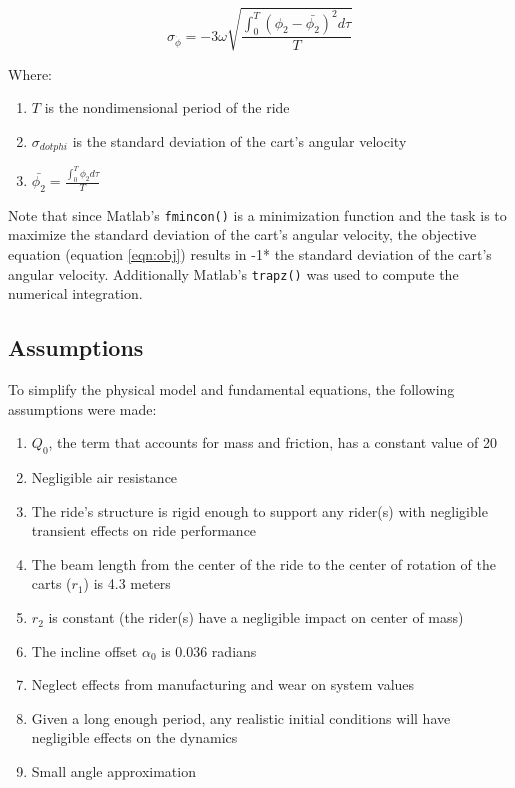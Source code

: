 \documentclass[11pt]{article}%
\begin{document}
\begin{equation}
\label{eqn:obj}
\sigma_{\dot{\phi}} = -3\omega\sqrt{\frac{\int_{0}^{T}(\phi_{2}-\bar{\phi_{2}})^{2}d\tau}{T}}
\end{equation}

Where: 
\begin{enumerate}
	\item $T$ is the nondimensional period of the ride 
	\item $\sigma_{dot{phi}}$ is the standard deviation of the cart's angular velocity
	\item $\bar{\phi_{2}}=\frac{\int_{0}^{T}\phi_{2}d\tau}{T}$
\end{enumerate}

Note that since Matlab's \lstinline{fmincon()} is a minimization function and the task is to maximize the standard deviation of the cart's angular velocity, the objective equation (equation \ref{eqn:obj}) results in -1* the standard deviation of the cart's angular velocity. Additionally Matlab's \lstinline{trapz()} was used to compute the numerical integration.

\subsection{Assumptions}
\label{sec:assumption}
To simplify the physical model and fundamental equations, the following assumptions were made:
\begin{enumerate}
   	 \item $Q_{0}$, the term that accounts for mass and friction, has a constant value of 20
   	 \item Negligible air resistance
   	 \item The ride's structure is rigid enough to support any rider(s) with negligible transient effects on ride performance
   	 \item The beam length from the center of the ride to the center of rotation of the carts ($r_{1}$) is 4.3 meters
   	 \item $r_{2}$ is constant (the rider(s) have a negligible impact on center of mass)
   	 \item The incline offset $\alpha_{0}$ is 0.036 radians
   	 \item Neglect effects from manufacturing and wear on system values
   	 \item Given a long enough period, any realistic initial conditions will have negligible effects on the dynamics
   	 \item Small angle approximation
\end{enumerate}
\end{document}
